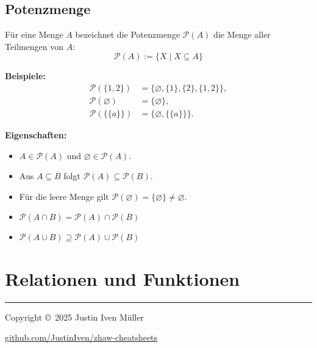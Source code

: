 \documentclass[10pt,landscape]{article}
\begin{document}
\begin{multicols*}{4}
\subsection{Potenzmenge}
Für eine Menge \(A\) bezeichnet die Potenzmenge \( \mathcal{P}(A) \) die Menge aller Teilmengen von \(A\):
\[
\mathcal{P}(A):=\{X \mid X\subseteq A\}
\]

\textbf{Beispiele:}
\begin{align*}
\mathcal{P}(\{1,2\}) &= \{\varnothing,\{1\},\{2\},\{1,2\}\},\\
\mathcal{P}(\varnothing) &= \{\varnothing\},\\
\mathcal{P}(\{\{a\}\}) &= \{\varnothing,\{\{a\}\}\}.
\end{align*}

\textbf{Eigenschaften:}
\begin{itemize}
  \item \(A\in\mathcal{P}(A)\) und \(\varnothing\in\mathcal{P}(A)\).
  \item Aus \(A\subseteq B\) folgt \(\mathcal{P}(A)\subseteq\mathcal{P}(B)\).
  \item Für die leere Menge gilt \(\mathcal{P}(\varnothing)=\{\varnothing\}\neq\varnothing\).
  \item \(\mathcal{P}(A\cap B)=\mathcal{P}(A)\cap\mathcal{P}(B)\)
  \item \(\mathcal{P}(A\cup B)\supseteq \mathcal{P}(A)\cup\mathcal{P}(B)\)
\end{itemize}

\section{Relationen und Funktionen}






\vfill

\rule{0.3\linewidth}{0.25pt}
\scriptsize

Copyright \copyright\ 2025 Justin Iven Müller

\href{https://github.com/JustinIven/zhaw-cheatsheets}{github.com/JustinIven/zhaw-cheatsheets}


\end{multicols*}
\end{document}
